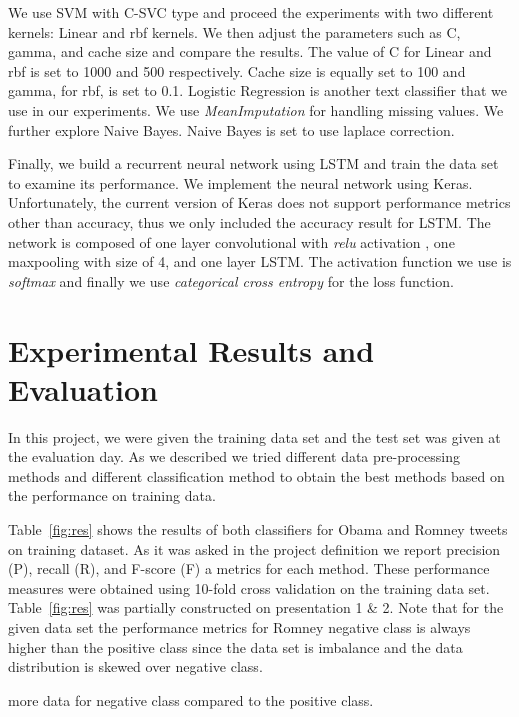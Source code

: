 \documentclass[letterpaper, 12pt]{article}
\begin{document}
We use SVM with C-SVC type and proceed the experiments with two different kernels: Linear and rbf 
kernels. We then adjust the parameters such as C, gamma, and cache size and compare the results. 
The value of C for Linear and rbf is set to 1000 and 500 respectively. Cache size is equally set 
to 100 and gamma, for rbf, is set to 0.1.  Logistic Regression is another text classifier that we use in our experiments. We use \emph{MeanImputation}
for handling missing values. We further explore Naive Bayes. Naive Bayes is set to use laplace 
correction. 



Finally, we build a recurrent neural network using LSTM and train the data set to examine its 
performance. We implement the neural network using Keras. Unfortunately, the current version 
of Keras does not support performance metrics other than accuracy, thus we only included the 
accuracy result for LSTM. The network is composed of one layer convolutional with \emph{relu} activation
, one maxpooling with size of 4, and one layer LSTM. The activation function we use 
is \emph{softmax} and finally we use \emph{categorical cross entropy}
for the loss function. 


\section{Experimental Results and Evaluation}

In this project, we were given the training data set and the test set was given at the evaluation day. As we described we tried different data pre-processing methods and different classification method to obtain the best methods based on the performance on training data. 

Table~\ref{fig:res} shows the results of both 
classifiers for Obama and Romney tweets on training dataset.  As it was asked in the project definition we report precision (P), recall (R), and F-score (F) a metrics for each method.  These performance measures were obtained using 10-fold cross validation on the training data set. Table~\ref{fig:res} was partially constructed on presentation 1 \& 2.  Note that for the given data set the performance metrics for Romney negative class is always higher than the positive class since the data set is imbalance and the data distribution is skewed over negative class. 

       
more data for negative class compared to the positive class.
\end{document}
